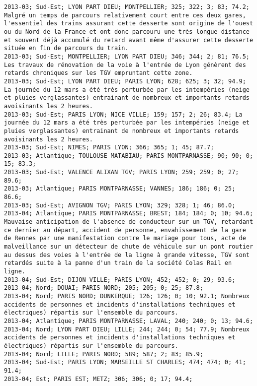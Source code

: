 \documentclass{article}
\begin{document}
\begin{Verbatim}[commandchars=\\\{\}]
2013-03; Sud-Est; LYON PART DIEU; MONTPELLIER; 325; 322; 3; 83; 74.2; Malgré un temps de parcours relativement court entre ces deux gares, l'essentiel des trains assurant cette desserte sont origine de l'ouest ou du Nord de la France et ont donc parcouru une très longue distance et souvent déjà accumulé du retard avant même d'assurer cette desserte située en fin de parcours du train.
2013-03; Sud-Est; MONTPELLIER; LYON PART DIEU; 346; 344; 2; 81; 76.5; Les travaux de rénovation de la voie à l'entrée de Lyon génèrent des retards chroniques sur les TGV empruntant cette zone.
2013-03; Sud-Est; LYON PART DIEU; PARIS LYON; 628; 625; 3; 32; 94.9; La journée du 12 mars a été très perturbée par les intempéries (neige et pluies verglassantes) entrainant de nombreux et importants retards avoisinants les 2 heures.
2013-03; Sud-Est; PARIS LYON; NICE VILLE; 159; 157; 2; 26; 83.4; La journée du 12 mars a été très perturbée par les intempéries (neige et pluies verglassantes) entrainant de nombreux et importants retards avoisinants les 2 heures.
2013-03; Sud-Est; NIMES; PARIS LYON; 366; 365; 1; 45; 87.7; 
2013-03; Atlantique; TOULOUSE MATABIAU; PARIS MONTPARNASSE; 90; 90; 0; 15; 83.3; 
2013-03; Sud-Est; VALENCE ALIXAN TGV; PARIS LYON; 259; 259; 0; 27; 89.6; 
2013-03; Atlantique; PARIS MONTPARNASSE; VANNES; 186; 186; 0; 25; 86.6; 
2013-03; Sud-Est; AVIGNON TGV; PARIS LYON; 329; 328; 1; 46; 86.0; 
2013-04; Atlantique; PARIS MONTPARNASSE; BREST; 184; 184; 0; 10; 94.6; Mauvaise anticipation de l'absence de conducteur sur un TGV, retardant ce dernier au départ, accident de personne, envahissement de la gare de Rennes par une manifestation contre le mariage pour tous, acte de malveillance sur un détecteur de chute de véhicule sur un pont routier au dessus des voies à l'entrée de la ligne à grande vitesse, TGV sont retardés suite à la panne d'un train de la société Colas Rail en ligne.
2013-04; Sud-Est; DIJON VILLE; PARIS LYON; 452; 452; 0; 29; 93.6; 
2013-04; Nord; DOUAI; PARIS NORD; 205; 205; 0; 25; 87.8; 
2013-04; Nord; PARIS NORD; DUNKERQUE; 126; 126; 0; 10; 92.1; Nombreux accidents de personnes et incidents d'installations techniques et électriques) répartis sur l'ensemble du parcours.
2013-04; Atlantique; PARIS MONTPARNASSE; LAVAL; 240; 240; 0; 13; 94.6; 
2013-04; Nord; LYON PART DIEU; LILLE; 244; 244; 0; 54; 77.9; Nombreux accidents de personnes et incidents d'installations techniques et électriques) répartis sur l'ensemble du parcours.
2013-04; Nord; LILLE; PARIS NORD; 589; 587; 2; 83; 85.9; 
2013-04; Sud-Est; PARIS LYON; MARSEILLE ST CHARLES; 474; 474; 0; 41; 91.4; 
2013-04; Est; PARIS EST; METZ; 306; 306; 0; 17; 94.4; 

\end{Verbatim}
\end{document}
